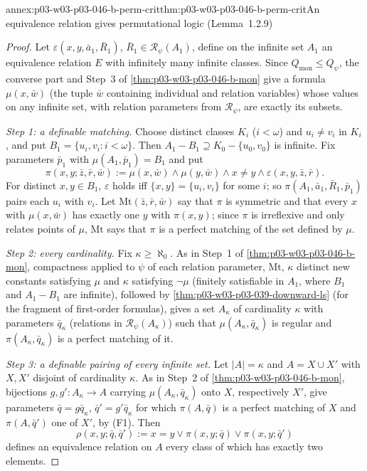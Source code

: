 \begin{annexitem}{annex:p03-w03-p03-046-b-perm-crit}{thm:p03-w03-p03-046-b-perm-crit}{An equivalence relation gives permutational logic (Lemma~1.2.9)}
\begin{proof}
Let \(\varepsilon(x,y,\bar a_1,\bar R_1)\), \(\bar R_1\in\mathscr
R_\psi(A_1)\), define on the infinite set \(A_1\) an equivalence relation
\(E\) with infinitely many infinite classes. Since
\(Q_{\mathrm{mon}}\le Q_\psi\), the converse part and Step~3 of
\cref{thm:p03-w03-p03-046-b-mon} give a formula \(\mu(x,\bar w)\) (the
tuple \(\bar w\) containing individual and relation variables) whose
values on any infinite set, with relation parameters from \(\mathscr
R_\psi\), are exactly its subsets.

\emph{Step 1: a definable matching.} Choose distinct classes \(K_i\)
(\(i<\omega\)) and \(u_i\neq v_i\) in \(K_i\), and put
\(B_1=\{u_i,v_i:i<\omega\}\). Then \(A_1-B_1\supseteq K_0-\{u_0,v_0\}\) is
infinite. Fix parameters \(\bar p_1\) with \(\mu(A_1,\bar p_1)=B_1\) and put
\[
\pi(x,y;\bar z,\bar r,\bar w):=\mu(x,\bar w)\wedge\mu(y,\bar w)\wedge
x\neq y\wedge\varepsilon(x,y,\bar z,\bar r).
\]
For distinct \(x,y\in B_1\), \(\varepsilon\) holds iff \(\{x,y\}=\{u_i,v_i\}\)
for some \(i\); so \(\pi(A_1,\bar a_1,\bar R_1,\bar p_1)\) pairs each
\(u_i\) with \(v_i\). Let \(\mathrm{Mt}(\bar z,\bar r,\bar w)\) say that
\(\pi\) is symmetric and that every \(x\) with \(\mu(x,\bar w)\) has
exactly one \(y\) with \(\pi(x,y)\); since \(\pi\) is irreflexive and only
relates points of \(\mu\), \(\mathrm{Mt}\) says that \(\pi\) is a perfect
matching of the set defined by \(\mu\).

\emph{Step 2: every cardinality.} Fix \(\kappa\ge\aleph_0\). As in Step~1 of
\cref{thm:p03-w03-p03-046-b-mon}, compactness applied to \(\psi\) of each
relation parameter, \(\mathrm{Mt}\), \(\kappa\) distinct new constants
satisfying \(\mu\) and \(\kappa\) satisfying \(\neg\mu\) (finitely
satisfiable in \(A_1\), where \(B_1\) and \(A_1-B_1\) are infinite), followed
by \cref{thm:p03-w03-p03-039-downward-ls} (for the fragment of first-order formulas), gives a set \(A_\kappa\) of cardinality
\(\kappa\) with parameters \(\bar q_\kappa\) (relations in \(\mathscr
R_\psi(A_\kappa)\)) such that \(\mu(A_\kappa,\bar q_\kappa)\) is regular
and \(\pi(A_\kappa,\bar q_\kappa)\) is a perfect matching of it.

\emph{Step 3: a definable pairing of every infinite set.} Let \(|A|=\kappa\)
and \(A=X\cup X'\) with \(X,X'\) disjoint of cardinality \(\kappa\). As in
Step~2 of \cref{thm:p03-w03-p03-046-b-mon}, bijections \(g,g'\colon
A_\kappa\to A\) carrying \(\mu(A_\kappa,\bar q_\kappa)\) onto \(X\),
respectively \(X'\), give parameters \(\bar q=g\bar q_\kappa\),
\(\bar q'=g'\bar q_\kappa\) for which \(\pi(A,\bar q)\) is a perfect
matching of \(X\) and \(\pi(A,\bar q')\) one of \(X'\), by (F1). Then
\[
\rho(x,y;\bar q,\bar q'):=x=y\vee\pi(x,y;\bar q)\vee\pi(x,y;\bar q')
\]
defines an equivalence relation on \(A\) every class of which has exactly
two elements.


\end{proof}
\end{annexitem}
